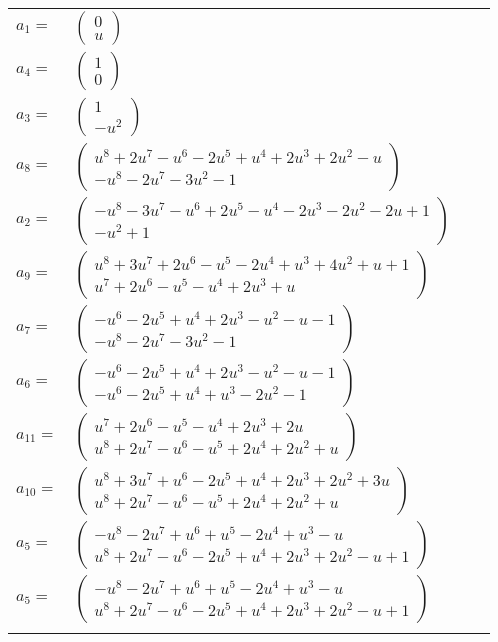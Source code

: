 \documentclass[1p]{elsarticle_modified}
\theoremstyle{definition}
\begin{document}
\begin{tabular}{m{7pt} m{180pt} m{7pt} m{180pt} }
\flushright $a_{1}=$&$\begin{pmatrix}0\\u\end{pmatrix}$ \\
\flushright $a_{4}=$&$\begin{pmatrix}1\\0\end{pmatrix}$ \\
\flushright $a_{3}=$&$\begin{pmatrix}1\\- u^2\end{pmatrix}$ \\
\flushright $a_{8}=$&$\begin{pmatrix}u^8+2 u^7- u^6-2 u^5+u^4+2 u^3+2 u^2- u\\- u^8-2 u^7-3 u^2-1\end{pmatrix}$ \\
\flushright $a_{2}=$&$\begin{pmatrix}- u^8-3 u^7- u^6+2 u^5- u^4-2 u^3-2 u^2-2 u+1\\- u^2+1\end{pmatrix}$ \\
\flushright $a_{9}=$&$\begin{pmatrix}u^8+3 u^7+2 u^6- u^5-2 u^4+u^3+4 u^2+u+1\\u^7+2 u^6- u^5- u^4+2 u^3+u\end{pmatrix}$ \\
\flushright $a_{7}=$&$\begin{pmatrix}- u^6-2 u^5+u^4+2 u^3- u^2- u-1\\- u^8-2 u^7-3 u^2-1\end{pmatrix}$ \\
\flushright $a_{6}=$&$\begin{pmatrix}- u^6-2 u^5+u^4+2 u^3- u^2- u-1\\- u^6-2 u^5+u^4+u^3-2 u^2-1\end{pmatrix}$ \\
\flushright $a_{11}=$&$\begin{pmatrix}u^7+2 u^6- u^5- u^4+2 u^3+2 u\\u^8+2 u^7- u^6- u^5+2 u^4+2 u^2+u\end{pmatrix}$ \\
\flushright $a_{10}=$&$\begin{pmatrix}u^8+3 u^7+u^6-2 u^5+u^4+2 u^3+2 u^2+3 u\\u^8+2 u^7- u^6- u^5+2 u^4+2 u^2+u\end{pmatrix}$ \\
\flushright $a_{5}=$&$\begin{pmatrix}- u^8-2 u^7+u^6+u^5-2 u^4+u^3- u\\u^8+2 u^7- u^6-2 u^5+u^4+2 u^3+2 u^2- u+1\end{pmatrix}$\\ \flushright $a_{5}=$&$\begin{pmatrix}- u^8-2 u^7+u^6+u^5-2 u^4+u^3- u\\u^8+2 u^7- u^6-2 u^5+u^4+2 u^3+2 u^2- u+1\end{pmatrix}$\\&\end{tabular}
\end{document}
